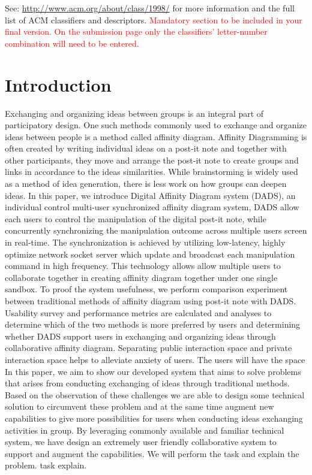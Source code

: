 \documentclass{sigchi}
\begin{document}


See: \url{http://www.acm.org/about/class/1998/}
for more information and the full list of ACM classifiers
and descriptors. 
\textcolor{red}{Mandatory section to be included in your
final version. On the submission page only the classifiers'
letter-number combination will need to be entered.}

\section{Introduction}
Exchanging and organizing ideas between groups is an integral part of participatory design. One such methods commonly used to exchange and organize ideas between people is a method called affinity diagram. Affinity Diagramming is often created by writing individual ideas on a post-it note and together with other participants, they move and arrange the post-it note to create groups and links in accordance to the ideas similarities. While brainstorming is widely used as a method of idea generation, there is less work on how groups can deepen ideas.\cite{dickey2012framespaces}
 In this paper, we introduce Digital Affinity Diagram system (DADS), an individual control multi-user synchronized affinity diagram system, DADS allow each users to control the manipulation of the digital post-it note, while concurrently synchronizing the manipulation outcome across multiple users screen in real-time. The synchronization is achieved by utilizing low-latency, highly optimize network socket server which update and broadcast each manipulation command in high frequency. This technology allows allow multiple users to collaborate together in creating affinity diagram together under one single sandbox. To proof the system usefulness, we perform comparison experiment between traditional methods of affinity diagram using post-it note with DADS. Usability survey and performance metrics are calculated and analyses to determine which of the two methods is more preferred by users and determining whether DADS support users in exchanging and organizing ideas through collaborative affinity diagram. Separating public interaction space and private interaction space helps to alleviate anxiety of users. The users will have the space 
In this paper, we aim to show our developed system that aims to solve  problems that arises from  conducting exchanging of ideas through traditional methods. Based on the observation of these challenges we are able to design some technical solution to circumvent these problem and at the same time augment new capabilities to give more possibilities for users when conducting  ideas exchanging activities in group. By leveraging commonly available  and familiar technical system, we have design  an extremely user friendly  collaborative system to support and  augment the capabilities. We will perform the task and explain the problem.  task explain.  
\end{document}
